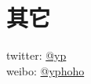 \documentclass[11pt, a4paper]{article}
\begin{document}
\section*{其它}

twitter: \href{https://twitter.com/yangpengg}{@yp} \\
weibo: \href{http://weibo.com/yangpengg}{@yphoho} \\
\end{document}
